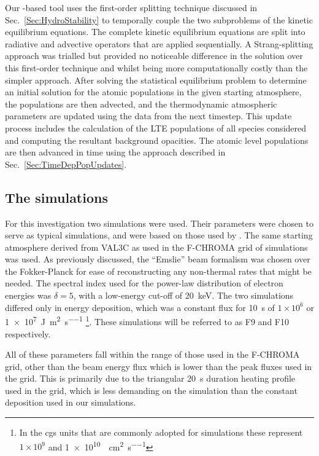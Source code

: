 Our \Lw{}-based tool uses the first-order splitting technique discussed in Sec.~\ref{Sec:HydroStability} to temporally couple the two subproblems of the kinetic equilibrium equations.
The complete kinetic equilibrium equations are split into radiative and advective operators that are applied sequentially.
A Strang-splitting approach was trialled but provided no noticeable difference in the solution over this first-order technique and whilst being more computationally costly than the simpler approach.
After solving the statistical equilibrium problem to determine an initial solution for the atomic populations in the given starting atmosphere, the populations are then advected, and the thermodynamic atmospheric parameters are updated using the \Radyn{} data from the next timestep.
This update process includes the calculation of the LTE populations of all species considered and computing the resultant background opacities.
The atomic level populations are then advanced in time using the approach described in Sec.~\ref{Sec:TimeDepPopUpdates}.

\subsection{The \Radyn{} simulations}

For this investigation two \Radyn{} simulations were used.
Their parameters were chosen to serve as typical simulations, and were based on those used by \citet{Kerr2019, Kerr2019a}.
The same starting atmosphere derived from VAL3C \citep{Vernazza1981} as used in the F-CHROMA grid of simulations was used.
As previously discussed, the ``Emslie'' beam formalism was chosen over the Fokker-Planck for ease of reconstructing any non-thermal rates that might be needed.
The spectral index used for the power-law distribution of electron energies was $\delta=5$, with a low-energy cut-off of \SI{20}{\kilo\electronvolt}.
The two simulations differed only in energy deposition, which was a constant flux for \SI{10}{\second} of $1\times 10^{6}$ or \SI{1e7}{\joule\per\square\metre\per\second} \footnote{In the cgs units that are commonly adopted for \Radyn{} simulations these represent $1\times 10^9$ and \SI{1e10}{\erg\per\square\centi\metre\per\second}}.
These simulations will be referred to as F9 and F10 respectively.

All of these parameters fall within the range of those used in the F-CHROMA grid, other than the beam energy flux which is lower than the peak fluxes used in the grid.
This is primarily due to the triangular \SI{20}{\second} duration heating profile used in the grid, which is less demanding on the simulation than the constant deposition used in our simulations.

